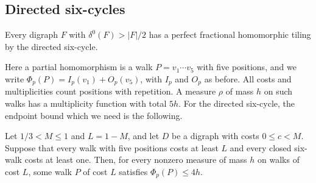 \subsection{Directed six-cycles}
\label{c6:section}\label{compact390:directed-six}

\begin{theorem}\label{c6:thm:fractional}
Every digraph $F$ with $\delta^0(F)>|F|/2$ has a perfect fractional homomorphic tiling by the directed six-cycle.
\end{theorem}

Here a partial homomorphism is a walk $P=v_1\cdots v_5$ with five positions, and we write
$\Phi_p(P)=I_p(v_1)+O_p(v_5)$, with $I_p$ and $O_p$ as before. All costs and multiplicities count positions with repetition. A measure $\rho$ of mass $h$ on such walks has a multiplicity function with total $5h$.
For the directed six-cycle, the endpoint bound which we need is the following.

\begin{theorem}\label{c6:thm:endpoint}
Let $1/3<M\le1$ and $L=1-M$, and let $D$ be a digraph with costs $0\le c<M$. Suppose that every walk with five positions costs
at least $L$ and every closed six-walk costs at least one.
Then, for every nonzero measure of mass $h$ on walks of cost $L$, some walk $P$ of cost $L$ satisfies $\Phi_p(P)\le4h$.
\end{theorem}


